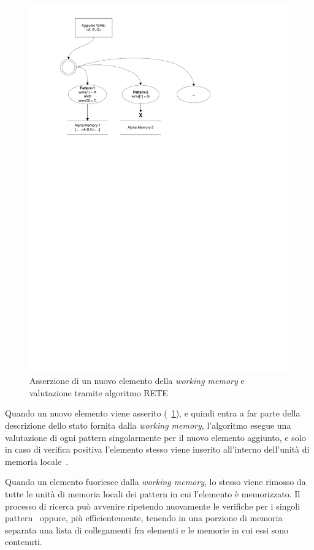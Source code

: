 \begin{figure}[h]
\centering
\includegraphics[viewport=70 545 416 812]{Immagini/Capitolo1/Asserzione.pdf}
\caption{Asserzione di un nuovo elemento della \emph{working memory} e valutazione tramite algoritmo RETE}\label{fig:asserzione}
\end{figure}

Quando un nuovo elemento viene asserito (\figurename~\ref{fig:asserzione}), e quindi entra a far parte della descrizione dello stato fornita dalla \emph{working memory}, l'algoritmo esegue una valutazione di ogni pattern singolarmente per il nuovo elemento aggiunto, e solo in caso di verifica positiva l'elemento stesso viene inserito all'interno dell'unità di memoria locale~\cite{forgy1982}.

Quando un elemento fuoriesce dalla \emph{working memory}, lo stesso viene rimosso da tutte le unità di memoria locali dei pattern in cui l'elemento è memorizzato. Il processo di ricerca può avvenire ripetendo nuovamente le verifiche per i singoli pattern~\cite{forgy1982} oppure, più efficientemente, tenendo in una porzione di memoria separata una lista di collegamenti fra elementi e le memorie in cui essi sono contenuti.~\cite{Doorenbos95productionmatching}

